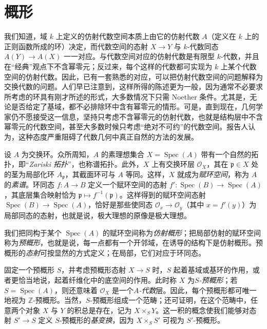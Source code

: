 \chapter{概形}\thispagestyle{fancy}\label{fga2-1}
\par{}我们知道，域 \(k\) 上定义的仿射代数空间本质上由它的仿射代数 \(A\)（定义在 \(k\) 上的正则函数所成的环）决定，而代数空间的态射 \(X\to  Y\) 与 \(k\)-代数同态 \(A(Y)\to  A(X)\) 一一对应。与代数空间对应的仿射代数是有限型 \(k\)-代数，并且在“经典”观点下不含幂零元；反过来，每个这样的代数都可实现为 \(k\) 上某个代数空间的仿射代数。因此，已有一套熟悉的对应，可以把仿射代数空间的问题解释为交换代数的问题。人们早已注意到，这样所得的陈述更为一般，因为通常不必要求所考虑的环具有刚才所述的形式，大多数情况下只需 Noether 条件。尤其是，无论是否给定了基域，都不必排除环中含有幂零元的情形。可是，直到现在，几何学家仍不愿接受这一信息，坚持只考虑不含幂零元的仿射代数，也就是结构层中不含幂零元的代数空间，甚至大多数时候只考虑“绝对不可约”的代数空间。报告人认为，这种态度严重阻碍了代数几何中真正自然的方法的发展。
\par{}设 \(A\) 为交换环。众所周知，\(A\) 的素理想集合 \(X=\operatorname {Spec}(A)\) 带有一个自然的拓扑，即“\emph{Zariski 拓扑}”，也称谱拓扑。此外，\(X\) 上有交换环层 \(\mathcal {O}_X\)，其在 \(\mathfrak {p}\in  X\) 处的茎为局部化环 \(A_\mathfrak {p}\)，其截面环可与 \(A\) 等同。这样，\(X\) 就成为\emph{赋环空间}，称为 \(A\) 的\emph{素谱}。环同态 \(f\colon  A\to  B\) 定义一个赋环空间的态射 \(f'\colon \operatorname {Spec}(B)\to \operatorname {Spec}(A)\)，其底层集合映射恰为 \(\mathfrak {p}\mapsto  f^{-1}(\mathfrak {p})\)。这样得到的赋环空间态射 \(\operatorname {Spec}(B)\to \operatorname {Spec}(A)\)，恰好是那些使同态 \(\mathcal {O}_x\to \mathcal {O}_y\)（其中 \(x=f'(y)\)）为局部同态的态射，也就是说，极大理想的原像是极大理想。
\par{}我们把同构于某个 \(\operatorname {Spec}(A)\) 的赋环空间称为\emph{仿射概形}；把局部仿射的赋环空间称为\emph{预概形}，也就是说，每一点都有一个开邻域，在诱导的结构下是仿射概形。预概形的\emph{态射}可按显然的方式定义；在局部，它们对应于环同态。
\par{}固定一个预概形 \(S\)，并考虑预概形态射 \(X\to  S\) 时，\(S\) 起着基域或基环的作用，或者更恰当地说，起着纤维化中的底空间的作用。此时称 \(X\) 为\emph{\(S\)-预概形}；若 \(S=\operatorname {Spec}(A)\)，则还意味着 \(\mathcal {O}_X\) 是一个\emph{\(A\)-代数}层。因此，每个预概形都可唯一地视为 \(\mathbb {Z}\)-预概形。当然，\(S\)-预概形组成一个范畴；还可证明，在这个范畴中，任意两个对象 \(X\) 与 \(Y\) 的积总是存在，记为 \(X\times _S Y\)。这一积的概念使我们能够对态射 \(S'\to  S\) 定义 \(S\)-预概形的\emph{基变换}，因为 \(X\times _S S'\) 可视为 \(S'\)-预概形。
